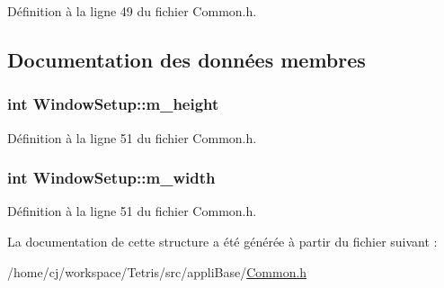 Définition à la ligne 49 du fichier Common.\-h.



\subsection{Documentation des données membres}
\hypertarget{struct_window_setup_ae015795573cf804d632bda194dbdc437}{
\subsubsection[{m\-\_\-height}]{\setlength{\rightskip}{0pt plus 5cm}int Window\-Setup\-::m\-\_\-height}}\label{struct_window_setup_ae015795573cf804d632bda194dbdc437}


Définition à la ligne 51 du fichier Common.\-h.

\hypertarget{struct_window_setup_a79928e5defb03915ceb701ea9d6e3284}{
\subsubsection[{m\-\_\-width}]{\setlength{\rightskip}{0pt plus 5cm}int Window\-Setup\-::m\-\_\-width}}\label{struct_window_setup_a79928e5defb03915ceb701ea9d6e3284}


Définition à la ligne 51 du fichier Common.\-h.



La documentation de cette structure a été générée à partir du fichier suivant \-:\begin{DoxyCompactItemize}
\item 
/home/cj/workspace/\-Tetris/src/appli\-Base/\hyperlink{_common_8h}{Common.\-h}\end{DoxyCompactItemize}
